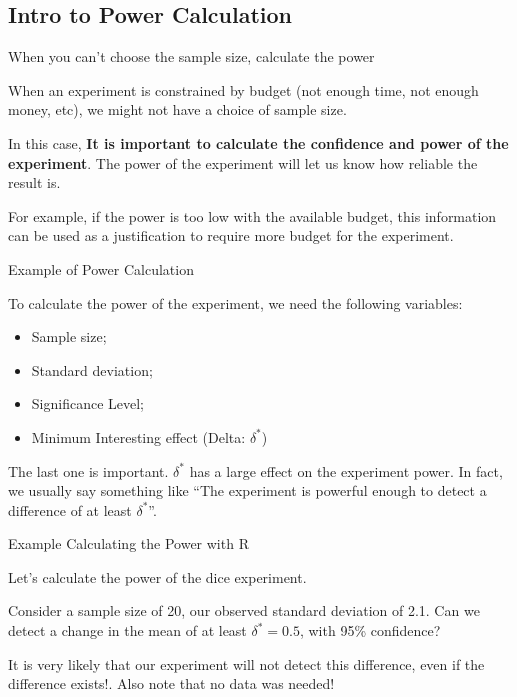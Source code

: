 \subsection{Intro to Power Calculation}

\begin{frame}{When you can't choose the sample size, calculate the power}

When an experiment is constrained by budget (not enough time,
not enough money, etc), we might not have a choice of sample size.\bigskip

In this case, {\bf It is important to calculate the confidence and
  power of the experiment}. The power of the experiment will let us
know how reliable the result is.\bigskip

For example, if the power is too low with the available budget, this
information can be used as a justification to require more budget for
the experiment.
\end{frame}


\begin{frame}{Example of Power Calculation}

  To calculate the power of the experiment, we need the following variables:
  \begin{itemize}
  \item Sample size;
  \item Standard deviation;
  \item Significance Level;
  \item Minimum Interesting effect (Delta: $\delta^*$)
  \end{itemize}\bigskip

  The last one is important. $\delta^*$ has a large effect on the
  experiment power. In fact, we usually say something like ``The
  experiment is powerful enough to detect a difference of at least
  $\delta^*$''.
\end{frame}

\begin{frame}[fragile]{Example Calculating the Power with R}

  Let's calculate the power of the dice experiment.\medskip

  Consider a sample size of 20, our observed standard deviation of
  2.1. Can we detect a change in the mean of at least $\delta^*=0.5$,
  with 95\% confidence?


It is very likely that our experiment will not detect this difference,
\alert{even if the difference exists!}. Also note that no data was needed!
\end{frame}

